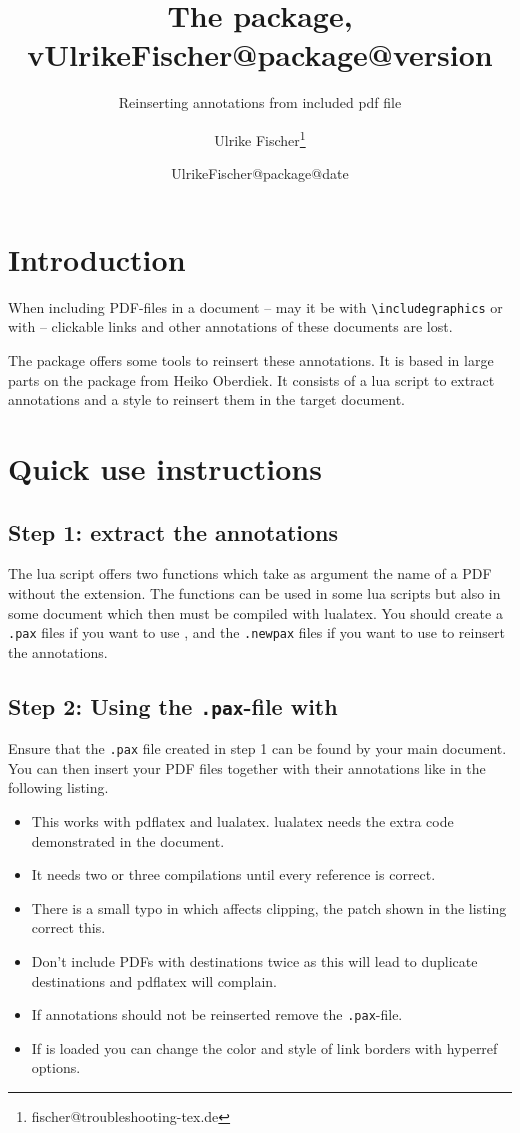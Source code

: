 \documentclass[DIV=12,parskip=half-,bibliography=totoc]{scrartcl}
\title{The \pkg{newpax} package, v\csname UlrikeFischer@package@version\endcsname}
\subtitle{Reinserting annotations from included pdf file}
\date{\csname UlrikeFischer@package@date\endcsname}
\author{Ulrike Fischer\thanks{fischer@troubleshooting-tex.de}}
\begin{document}
\maketitle

\section{Introduction}

When including PDF-files in a document -- may it be with \verb+\includegraphics+ or with \verb++ -- clickable links and other annotations of these documents are lost.

The   package offers some tools to reinsert these annotations. It is based in large parts
on the  package from Heiko Oberdiek. It consists of a lua script to extract annotations and a style to reinsert them in the target document. 

\section{Quick use instructions}
\subsection{Step 1: extract the annotations}
The lua script offers two functions which take as argument the name of a PDF without the extension.
The functions can be used in some lua scripts but also in some document which then must be compiled
with lualatex. You should create a \texttt{.pax} files if you want to use , and the \texttt{.newpax} files if you want to use  to reinsert the annotations.



\subsection{Step 2: Using the \texttt{.pax}-file with }

Ensure that the \texttt{.pax} file created in step 1 can be found by your main document. You can then insert your PDF files together with their annotations like in the following listing.

\begin{itemize}
\item This works with pdflatex and lualatex. lualatex needs the extra code demonstrated in the document.
\item It needs two or three compilations until every reference is correct.
\item There is a small typo in  which affects clipping, the patch shown in the listing correct this.
\item Don't include PDFs with destinations twice as this will lead to duplicate destinations and pdflatex will complain.
\item If annotations should not be reinserted remove the \texttt{.pax}-file.
\item If  is loaded you can change the color and style of link borders with hyperref options.
\end{itemize}
\end{document}

